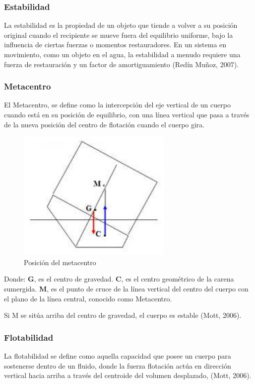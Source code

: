 \documentclass[letterpaper]{article}
\begin{document}
\subsubsection{Estabilidad}
\setlength{\parindent}{18pt}
La estabilidad es la propiedad de un objeto que tiende a volver a su posición original cuando el recipiente 
se mueve fuera del equilibrio uniforme, bajo la influencia de ciertas fuerzas o momentos restauradores. 
En un sistema en movimiento, como un objeto en el agua, la estabilidad a menudo requiere una fuerza de 
restauración y un factor de amortiguamiento (Redín Muñoz, 2007).
\newpage\

\subsubsection{Metacentro}
\setlength{\parindent}{18pt}
El Metacentro, se define como la intercepción del eje vertical de un cuerpo cuando está en su posición 
de equilibrio, con una línea vertical que pasa a través de la nueva posición del centro de flotación 
cuando el cuerpo gira.
\begin{figure}[H]
	\centering
	\includegraphics[width=0.3 \textwidth]{Metacentrotemporal.jpg}
	\caption{ Posición del metacentro}
	\label{fig:imagen0}
\end{figure}
Donde:
\newline
\textbf{G}, es el centro de gravedad.
\newline
\textbf{C}, es el centro geométrico de la carena sumergida.
\newline
\textbf{M}, es el punto de cruce de la línea vertical del centro del cuerpo con el plano de la línea central, 
conocido como Metacentro.


Si {M} se sitúa arriba del centro de gravedad, el cuerpo es estable (Mott, 2006).
\subsubsection{Flotabilidad}
\setlength{\parindent}{18pt}
La flotabilidad se define como aquella capacidad que posee un cuerpo para sostenerse dentro de un fluido, 
donde la fuerza flotación actúa en dirección vertical hacia arriba a través del centroide del volumen 
desplazado, (Mott, 2006).
\newpage
\end{document}
